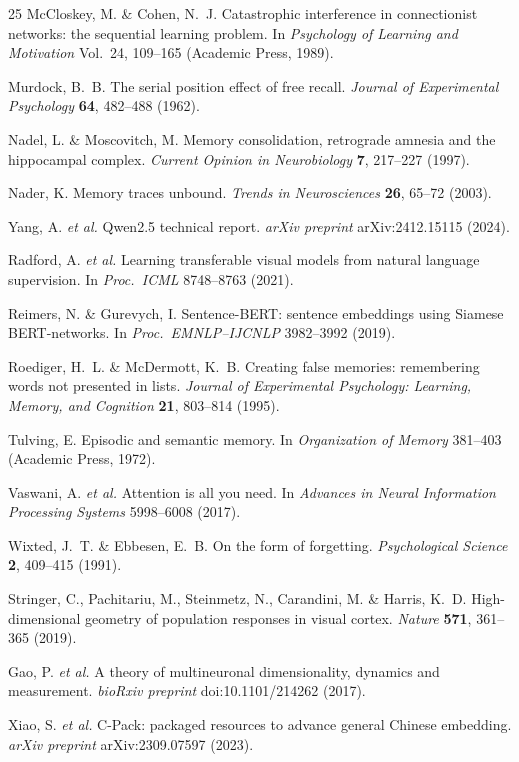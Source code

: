 \documentclass[11pt]{article}
\begin{document}
\begin{thebibliography}{25}
McCloskey, M. \& Cohen, N.~J.
\newblock Catastrophic interference in connectionist networks: the sequential learning problem.
\newblock In \textit{Psychology of Learning and Motivation} Vol.~24, 109--165 (Academic Press, 1989).

Murdock, B.~B.
\newblock The serial position effect of free recall.
\newblock \textit{Journal of Experimental Psychology} \textbf{64}, 482--488 (1962).

Nadel, L. \& Moscovitch, M.
\newblock Memory consolidation, retrograde amnesia and the hippocampal complex.
\newblock \textit{Current Opinion in Neurobiology} \textbf{7}, 217--227 (1997).

Nader, K.
\newblock Memory traces unbound.
\newblock \textit{Trends in Neurosciences} \textbf{26}, 65--72 (2003).

Yang, A. \textit{et al.}
\newblock Qwen2.5 technical report.
\newblock \textit{arXiv preprint} arXiv:2412.15115 (2024).

Radford, A. \textit{et al.}
\newblock Learning transferable visual models from natural language supervision.
\newblock In \textit{Proc.\ ICML} 8748--8763 (2021).

Reimers, N. \& Gurevych, I.
\newblock Sentence-{BERT}: sentence embeddings using {S}iamese {BERT}-networks.
\newblock In \textit{Proc.\ EMNLP--IJCNLP} 3982--3992 (2019).

Roediger, H.~L. \& McDermott, K.~B.
\newblock Creating false memories: remembering words not presented in lists.
\newblock \textit{Journal of Experimental Psychology: Learning, Memory, and Cognition} \textbf{21}, 803--814 (1995).

Tulving, E.
\newblock Episodic and semantic memory.
\newblock In \textit{Organization of Memory} 381--403 (Academic Press, 1972).

Vaswani, A. \textit{et al.}
\newblock Attention is all you need.
\newblock In \textit{Advances in Neural Information Processing Systems} 5998--6008 (2017).

Wixted, J.~T. \& Ebbesen, E.~B.
\newblock On the form of forgetting.
\newblock \textit{Psychological Science} \textbf{2}, 409--415 (1991).

Stringer, C., Pachitariu, M., Steinmetz, N., Carandini, M. \& Harris, K.~D.
\newblock High-dimensional geometry of population responses in visual cortex.
\newblock \textit{Nature} \textbf{571}, 361--365 (2019).

Gao, P. \textit{et al.}
\newblock A theory of multineuronal dimensionality, dynamics and measurement.
\newblock \textit{bioRxiv preprint} doi:10.1101/214262 (2017).

Xiao, S. \textit{et al.}
\newblock C-Pack: packaged resources to advance general Chinese embedding.
\newblock \textit{arXiv preprint} arXiv:2309.07597 (2023).

\end{thebibliography}
\end{document}
